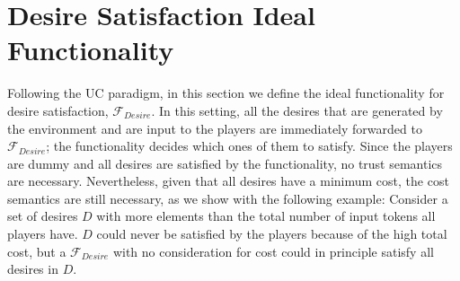\section{Desire Satisfaction Ideal Functionality}
  Following the UC paradigm, in this section we define the ideal functionality for desire satisfaction, $\mathcal{F}_{Desire}$.
  In this setting, all the desires that are generated by the environment and are input to the players are immediately forwarded
  to $\mathcal{F}_{Desire}$; the functionality decides which ones of them to satisfy. Since the players are dummy and all
  desires are satisfied by the functionality, no trust semantics are necessary. Nevertheless, given that all desires have a
  minimum cost, the cost semantics are still necessary, as we show with the following example: Consider a set of desires $D$
  with more elements than the total number of input tokens all players have. $D$ could never be satisfied by the players
  because of the high total cost, but a $\mathcal{F}_{Desire}$ with no consideration for cost could in principle satisfy all
  desires in $D$. 
